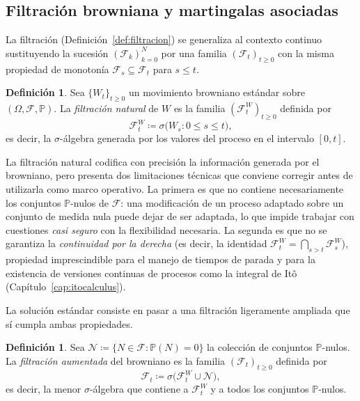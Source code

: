 \documentclass[11pt,a4paper,oneside]{report}
\theoremstyle{plain}
\theoremstyle{definition}
\newtheorem{definicion}[teorema]{Definición}
\theoremstyle{remark}
\newcommand{\PP}{\mathbb{P}}
\newcommand{\F}{\mathcal{F}}
\newcommand{\1}{\mathbf{1}}
\newcommand{\eqdef}{\coloneqq}
\begin{document}
\subsection{Filtración browniana y martingalas asociadas}
\label{subsec:filtracion_y_martingalas}

La filtración
(Definición~\ref{def:filtracion}) se generaliza al contexto continuo
sustituyendo la sucesión $(\F_k)_{k=0}^N$ por una familia
$(\F_t)_{t \geq 0}$ con la misma propiedad de monotonía $\F_s
\subseteq \F_t$ para $s \leq t$.

\begin{definicion}
\label{def:filtracion_browniana}
Sea $\{W_t\}_{t \geq 0}$ un movimiento browniano estándar sobre
$(\Omega, \F, \PP)$. La \emph{filtración natural} de $W$ es la familia
$(\F_t^W)_{t \geq 0}$ definida por
\begin{equation*}
  \F_t^W \eqdef \sigma\bigl(W_s : 0 \leq s \leq t\bigr),
\end{equation*}
es decir, la $\sigma$-álgebra generada por los valores del proceso en el
intervalo $[0, t]$.
\end{definicion}

La filtración natural codifica con precisión la información generada por
el browniano, pero presenta dos limitaciones técnicas que conviene
corregir antes de utilizarla como marco operativo. La primera es que
no contiene necesariamente los conjuntos $\PP$-nulos de $\F$: una
modificación de un proceso adaptado sobre un conjunto de medida nula
puede dejar de ser adaptada, lo que impide trabajar con cuestiones
\emph{casi seguro} con la flexibilidad necesaria. La segunda es que
no se garantiza la \emph{continuidad por la derecha} (es decir, la
identidad $\F_t^W = \bigcap_{s > t} \F_s^W$), propiedad imprescindible para el manejo de tiempos de parada y para la
existencia de versiones continuas de procesos como la integral de
Itô (Capítulo~\ref{cap:itocalculus}).

La solución estándar consiste en pasar a una filtración ligeramente
ampliada que sí cumpla ambas propiedades.

\begin{definicion}
\label{def:filtracion_aumentada}
Sea $\mathcal{N} \eqdef \{N \in \F : \PP(N) = 0\}$ la colección de
conjuntos $\PP$-nulos. La \emph{filtración aumentada} del browniano
es la familia $(\F_t)_{t \geq 0}$ definida por
\begin{equation*}
  \F_t \eqdef \sigma\bigl(\F_t^W \cup \mathcal{N}\bigr),
\end{equation*}
es decir, la menor $\sigma$-álgebra que contiene a $\F_t^W$ y a todos
los conjuntos $\PP$-nulos.
\end{definicion}
\end{document}
